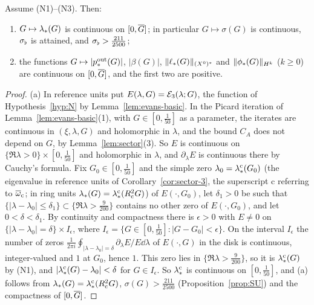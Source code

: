 \begin{proposition}
\label{prop:U}
Assume \textup{(N1)}--\textup{(N3)}. Then:
\begin{enumerate}[label=\textup{(\alph*)}]
\item $G\mapsto\lambda_*(G)$ is continuous on $[0,\overline{G}]$; in particular
  $G\mapsto\sigma(G)$ is continuous, $\sigma_\flat$ is attained, and $\sigma_\flat>\frac{211}{2500}$;
\item the functions $G\mapsto|p^{\mathrm{out}}_*(G)|$, $|\beta(G)|$, $\|\ell_*(G)\|_{(X^0)^*}$
  and $\|\phi_*(G)\|_{H^k}$ ($k\ge0$) are continuous on $[0,\overline{G}]$, and the first
  two are positive.
\end{enumerate}
\end{proposition}
\begin{proof}
(a) In reference units put $E(\lambda,G)=\mathcal{E}_3(\lambda;G)$, the function of
Hypothesis~\ref{hyp:N} by Lemma~\ref{lem:evans-basic}. In the Picard
iteration of Lemma~\ref{lem:evans-basic}(1), with $G\in[0,\frac1{50}]$ as a
parameter, the iterates are continuous in $(\xi,\lambda,G)$ and holomorphic in
$\lambda$, and the bound $C_A$ does not depend on $G$, by Lemma~\ref{lem:sector}(3).
So $E$ is continuous on $\{\Re\lambda>0\}\times[0,\frac1{50}]$ and holomorphic in
$\lambda$, and $\partial_\lambda E$ is continuous there by Cauchy's formula. Fix
$G_0\in[0,\frac1{50}]$ and the simple zero $\lambda_0=\lambda_*^{\mathrm c}(G_0)$ (the
eigenvalue in reference units of Corollary~\ref{cor:sector-3}, the superscript
$\mathrm c$ referring to $\overline{\omega}_{\mathrm{c}}$; in ring units $\lambda_*(G)=\lambda_*^{\mathrm c}(R_{\mathrm{c}}^2G)$) of
$E(\cdot,G_0)$, let $\delta_1>0$ be such that
$\{|\lambda-\lambda_0|\le\delta_1\}\subset\{\Re\lambda>\frac9{200}\}$ contains no
other zero of $E(\cdot,G_0)$, and let $0<\delta<\delta_1$. By continuity and
compactness there is $\epsilon>0$ with $E\ne0$ on
$\{|\lambda-\lambda_0|=\delta\}\times I_\epsilon$, where
$I_\epsilon=\{G\in[0,\frac1{50}]:|G-G_0|<\epsilon\}$. On the interval $I_\epsilon$
the number of zeros $\frac1{2\pi i}\oint_{|\lambda-\lambda_0|=\delta}\partial_\lambda E/E\dd\lambda$
of $E(\cdot,G)$ in the disk is continuous, integer-valued and $1$ at $G_0$, hence
$1$. This zero
lies in $\{\Re\lambda>\frac9{200}\}$, so it is $\lambda_*^{\mathrm c}(G)$ by (N1), and
$|\lambda_*^{\mathrm c}(G)-\lambda_0|<\delta$ for $G\in I_\epsilon$. So $\lambda_*^{\mathrm c}$
is continuous on $[0,\frac1{50}]$, and (a) follows from
$\lambda_*(G)=\lambda_*^{\mathrm c}(R_{\mathrm{c}}^2G)$, $\sigma(G)>\frac{211}{2500}$
(Proposition~\ref{prop:SU}) and the compactness of $[0,\overline{G}]$.


\end{proof}
